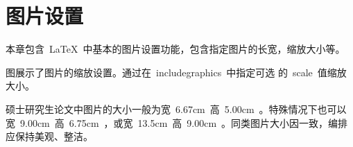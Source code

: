 \chapter{图片设置}

本章包含~\LaTeX~中基本的图片设置功能，包含指定图片的长宽，缩放大小等。

图展示了图片的缩放设置。通过在~includegraphics~中指定可选
的~scale~值缩放大小。

硕士研究生论文中图片的大小一般为宽~6.67cm~高~5.00cm~。特殊情况下也可以
宽~9.00cm~高~6.75cm~，或宽~13.5cm~高~9.00cm~。同类图片大小因一致，编排
应保持美观、整洁。

